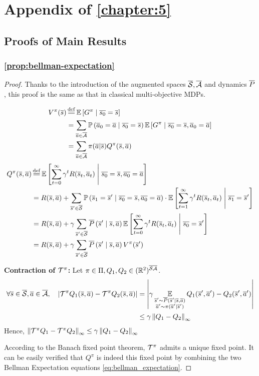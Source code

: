 \chapter{Appendix of \autoref{chapter:5}}
\section{Proofs of Main Results}
\label{sec:proofs}
\subsection{\autoref{prop:bellman-expectation}}

\begin{proof}
Thanks to the introduction of the augmented spaces $\overline{\mathcal{S}}, \overline{\mathcal{A}}$ and dynamics $\overline{P}$, this proof is the same as that in classical multi-objective MDPs.

\begin{align*}
    V^\pi(\os) &\eqdef \expectedvalue\left[ G^\pi \condbar \ov{s_0} = \os\right] \\
    &=\sum_{\oa\in\ocA} \probability{\oa_0 = \oa \condbar\ov{s_0} = \os} \expectedvalue\left[ G^\pi \condbar \ov{s_0} = \os, \oa_0 = \oa\right]\\
    &= \sum_{\oa\in\ocA} \pi(\oa | \os) Q^\pi(\os,\oa)
\end{align*}
\begin{align*}
    Q^\pi(\os, \oa) &\eqdef \expectedvalue\left[\sum_{t=0}^\infty \gamma^t R(\os_t, \oa_t)\condbar \ov{s_0} = \os, \ov{a_0} = \oa\right] \\
    &= R(\os, \oa) + \sum_{\os'\in\ocS}\probability{\os_1 = \os' \condbar\ov{s_0} = \os, \ov{a_0} = \oa}\cdot \expectedvalue\left[\sum_{t=1}^\infty \gamma^t R(\os_t, \oa_t)\condbar \ov{s_1} = \os'\right] \\
    &= R(\os, \oa) + \gamma\sum_{\os'\in\ocS}\ov{P}\left(\os' \condbar\os, \oa\right) \expectedvalue\left[\sum_{t=0}^\infty \gamma^t R(\os_t, \oa_t) \condbar \ov{s_0} = \os'\right] \\
    &=  R(\os, \oa) + \gamma\sum_{\os'\in\ocS}\ov{P}\left(\os' \condbar\os, \oa\right) V^\pi(\os')
\end{align*}

\textbf{Contraction of $\mathcal{T}^\pi$:}
Let $\pi\in\Pi, Q_1, Q_2\in(\mathbb{R}^2)^{\overline{\mathcal{S}}\overline{\mathcal{A}}}$.
\begin{align*}
    \forall \overline{s}\in\overline{\mathcal{S}}, \overline{a}\in\overline{\mathcal{A}},\quad \left|\mathcal{T}^\pi Q_1(\overline{s},\overline{a}) - \mathcal{T}^\pi Q_2(\overline{s},\overline{a})\right| &= \left|\gamma\operatorname*{\mathbb{E}}\limits_{\substack{\overline{s}'\sim\overline{P}(\overline{s}'|\overline{s},\overline{a}) \\ \overline{a}'\sim\pi(\overline{a}'|\overline{s}')}} Q_1(\overline{s}',\overline{a}') - Q_2(\overline{s}',\overline{a}')\right|\\
    &\leq \gamma\left\|Q_1-Q_2\right\|_\infty
\end{align*}
Hence, $\left\|\mathcal{T}^\pi Q_1  - \mathcal{T}^\pi Q_2 \right\|_\infty \leq \gamma\left\|Q_1-Q_2\right\|_\infty$

According to the Banach fixed point theorem, $\mathcal{T}^\pi$ admits a unique fixed point.
It can be easily verified that $Q^\pi$ is indeed this fixed point by combining the two Bellman Expectation equations \eqref{eq:bellman_expectation}.

\end{proof}

